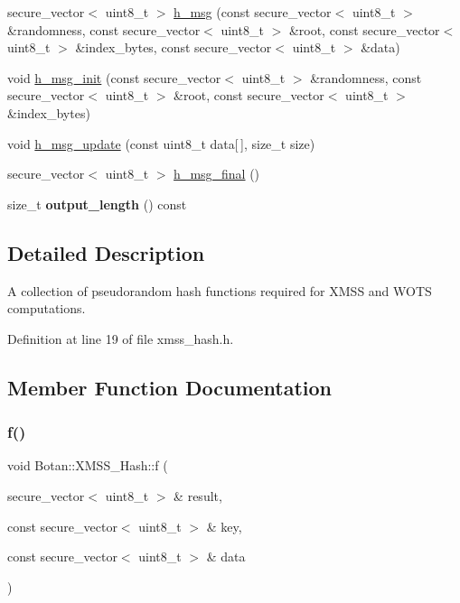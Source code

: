 \begin{DoxyCompactItemize}
secure\+\_\+vector$<$ uint8\+\_\+t $>$ \mbox{\hyperlink{class_botan_1_1_x_m_s_s___hash_a137212218bc04345ae369de0356b4ba3}{h\+\_\+msg}} (const secure\+\_\+vector$<$ uint8\+\_\+t $>$ \&randomness, const secure\+\_\+vector$<$ uint8\+\_\+t $>$ \&root, const secure\+\_\+vector$<$ uint8\+\_\+t $>$ \&index\+\_\+bytes, const secure\+\_\+vector$<$ uint8\+\_\+t $>$ \&data)
\item 
void \mbox{\hyperlink{class_botan_1_1_x_m_s_s___hash_a8098c0af45ca712b79ef01d904a060b6}{h\+\_\+msg\+\_\+init}} (const secure\+\_\+vector$<$ uint8\+\_\+t $>$ \&randomness, const secure\+\_\+vector$<$ uint8\+\_\+t $>$ \&root, const secure\+\_\+vector$<$ uint8\+\_\+t $>$ \&index\+\_\+bytes)
\item 
void \mbox{\hyperlink{class_botan_1_1_x_m_s_s___hash_a435374ec81321993332a76894fedf220}{h\+\_\+msg\+\_\+update}} (const uint8\+\_\+t data\mbox{[}$\,$\mbox{]}, size\+\_\+t size)
\item 
secure\+\_\+vector$<$ uint8\+\_\+t $>$ \mbox{\hyperlink{class_botan_1_1_x_m_s_s___hash_a8065fa620c9315124917a66653f8f48e}{h\+\_\+msg\+\_\+final}} ()
\item 
\mbox{\label{class_botan_1_1_x_m_s_s___hash_a34b50d71409357b29f27f333948bed00}} 
size\+\_\+t {\bfseries output\+\_\+length} () const
\end{DoxyCompactItemize}


\subsection{Detailed Description}
A collection of pseudorandom hash functions required for X\+M\+SS and W\+O\+TS computations. 

Definition at line 19 of file xmss\+\_\+hash.\+h.



\subsection{Member Function Documentation}
\mbox{\label{class_botan_1_1_x_m_s_s___hash_a142126cdbb5969ffdf13daeb6b903dc2}} 
\subsubsection{\texorpdfstring{f()}{f()}}
{\footnotesize\ttfamily void Botan\+::\+X\+M\+S\+S\+\_\+\+Hash\+::f (\begin{DoxyParamCaption}\item[{secure\+\_\+vector$<$ uint8\+\_\+t $>$ \&}]{result,  }\item[{const secure\+\_\+vector$<$ uint8\+\_\+t $>$ \&}]{key,  }\item[{const secure\+\_\+vector$<$ uint8\+\_\+t $>$ \&}]{data }\end{DoxyParamCaption})\hspace{0.3cm}{\ttfamily [inline]}}

